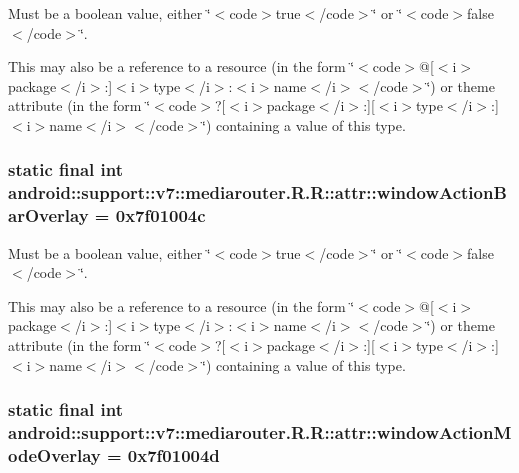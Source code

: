 Must be a boolean value, either \char`\"{}$<$code$>$true$<$/code$>$\char`\"{} or \char`\"{}$<$code$>$false$<$/code$>$\char`\"{}. 

This may also be a reference to a resource (in the form \char`\"{}$<$code$>$@\mbox{[}$<$i$>$package$<$/i$>$:\mbox{]}$<$i$>$type$<$/i$>$:$<$i$>$name$<$/i$>$$<$/code$>$\char`\"{}) or theme attribute (in the form \char`\"{}$<$code$>$?\mbox{[}$<$i$>$package$<$/i$>$:\mbox{]}\mbox{[}$<$i$>$type$<$/i$>$:\mbox{]}$<$i$>$name$<$/i$>$$<$/code$>$\char`\"{}) containing a value of this type. \hypertarget{classandroid_1_1support_1_1v7_1_1mediarouter_1_1_r_1_1attr_67cb8d9ef8fbe262b14a1304a10df963}{
\subsubsection[{windowActionBarOverlay}]{\setlength{\rightskip}{0pt plus 5cm}static final int android::support::v7::mediarouter.R.R::attr::windowActionBarOverlay = 0x7f01004c}}
\label{classandroid_1_1support_1_1v7_1_1mediarouter_1_1_r_1_1attr_67cb8d9ef8fbe262b14a1304a10df963}


Must be a boolean value, either \char`\"{}$<$code$>$true$<$/code$>$\char`\"{} or \char`\"{}$<$code$>$false$<$/code$>$\char`\"{}. 

This may also be a reference to a resource (in the form \char`\"{}$<$code$>$@\mbox{[}$<$i$>$package$<$/i$>$:\mbox{]}$<$i$>$type$<$/i$>$:$<$i$>$name$<$/i$>$$<$/code$>$\char`\"{}) or theme attribute (in the form \char`\"{}$<$code$>$?\mbox{[}$<$i$>$package$<$/i$>$:\mbox{]}\mbox{[}$<$i$>$type$<$/i$>$:\mbox{]}$<$i$>$name$<$/i$>$$<$/code$>$\char`\"{}) containing a value of this type. \hypertarget{classandroid_1_1support_1_1v7_1_1mediarouter_1_1_r_1_1attr_ea71f31a0c5c04f443bd3419cc1bf49e}{
\subsubsection[{windowActionModeOverlay}]{\setlength{\rightskip}{0pt plus 5cm}static final int android::support::v7::mediarouter.R.R::attr::windowActionModeOverlay = 0x7f01004d}}
\label{classandroid_1_1support_1_1v7_1_1mediarouter_1_1_r_1_1attr_ea71f31a0c5c04f443bd3419cc1bf49e}


